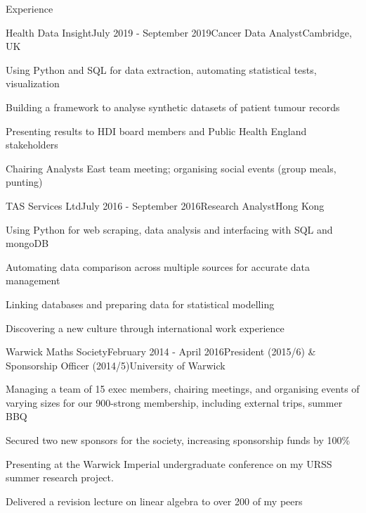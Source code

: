 \documentclass{zhresume} %
\begin{document}
\begin{rSection}{Experience}

\begin{rSubsection}{Health Data Insight}{July 2019 - September 2019}{Cancer Data Analyst}{Cambridge, UK}
\item Using Python and SQL for data extraction, automating statistical tests, visualization
\item Building a framework to analyse synthetic datasets of patient tumour records
\item Presenting results to HDI board members and Public Health England stakeholders
\item Chairing Analysts East team meeting; organising social events (group meals, punting)
\end{rSubsection}


\begin{rSubsection}{TAS Services Ltd}{July 2016 - September 2016}{Research Analyst}{Hong Kong}
\item Using Python for web scraping, data analysis and interfacing with SQL and mongoDB
\item Automating data comparison across multiple sources for accurate data management
\item Linking databases and preparing data for statistical modelling
\item Discovering a new culture through international work experience
\end{rSubsection}


\begin{rSubsection}{Warwick Maths Society}{February 2014 - April 2016}{President (2015/6) \& Sponsorship Officer (2014/5)}{University of Warwick}
\item Managing a team of 15 exec members, chairing meetings, and organising events of varying sizes for our 900-strong membership, including external trips, summer BBQ
\item Secured two new sponsors for the society, increasing sponsorship funds by 100\%
\item Presenting at the Warwick Imperial undergraduate conference on my URSS summer research project.
\item Delivered a revision lecture on linear algebra to over 200 of my peers
\end{rSubsection}

\end{rSection}
\end{document}

